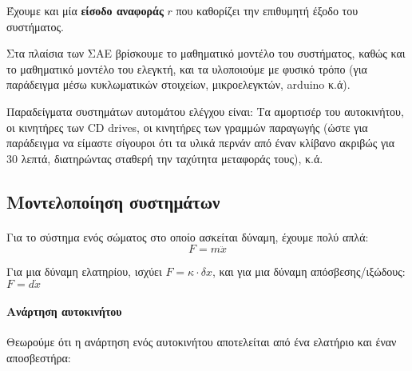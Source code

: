 \documentclass[11pt,a4paper,notitlepage,fleqn,final]{article}
\begin{document}
Έχουμε και μία \textbf{είσοδο αναφοράς} \( r \) που καθορίζει την επιθυμητή έξοδο του συστήματος.

Στα πλαίσια των ΣΑΕ βρίσκουμε το μαθηματικό μοντέλο του συστήματος, καθώς και το μαθηματικό
μοντέλο του ελεγκτή, και τα υλοποιούμε με φυσικό τρόπο (για παράδειγμα μέσω κυκλωματικών
στοιχείων, μικροελεγκτών, arduino κ.ά).

Παραδείγματα συστημάτων αυτομάτου ελέγχου είναι: Τα αμορτισέρ του αυτοκινήτου, οι κινητήρες
των CD drives, οι κινητήρες των γραμμών παραγωγής (ώστε για παράδειγμα να είμαστε σίγουροι
ότι τα υλικά περνάν από έναν κλίβανο ακριβώς για 30 λεπτά, διατηρώντας σταθερή την
ταχύτητα μεταφοράς τους), κ.ά.

\subsection{Μοντελοποίηση συστημάτων}
\paragraph{}
Για το σύστημα ενός σώματος στο οποίο ασκείται δύναμη, έχουμε πολύ απλά:
\[
	F = m\ddot x
\]

Για μια δύναμη ελατηρίου, ισχύει \( F = \kappa \cdot \delta x \), και για μια δύναμη
απόσβεσης/ιξώδους: \( F = d\dot x \)

\paragraph{Ανάρτηση αυτοκινήτου}
Θεωρούμε ότι η ανάρτηση ενός αυτοκινήτου αποτελείται από ένα ελατήριο και έναν αποσβεστήρα:

\end{document}
